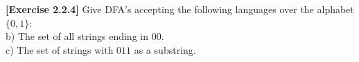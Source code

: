 \textbf{[Exercise 2.2.4]} Give DFA's accepting the following languages 
over the alphabet $\{0,1\}$:\\
b) The set of all strings ending in $00$.\\
c) The set of strings with $011$ as a substring.
